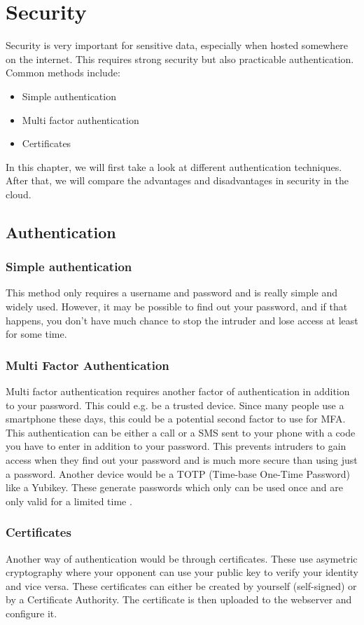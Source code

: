 \chapter{Security}
\label{chap:security}
Security is very important for sensitive data, especially when hosted somewhere on the internet.
This requires strong security but also practicable authentication. Common methods include:
\begin{itemize}
\item Simple authentication
\item Multi factor authentication
\item Certificates
\end{itemize}

In this chapter, we will first take a look at different authentication techniques. After that, we will compare the advantages and disadvantages in security in the cloud.

\section{Authentication}

\subsection{Simple authentication}
This method only requires a username and password and is really simple and widely used. However, it may be possible to find out your password, and if that happens, you don't have much chance to stop the intruder and lose access at least for some time.

\subsection{Multi Factor Authentication}
Multi factor authentication requires another factor of authentication in addition to your password. This could e.g. be a trusted device. Since many people use a smartphone these days, this could be a potential second factor to use for MFA.
This authentication can be either a call or a SMS sent to your phone with a code you have to enter in addition to your password. This prevents intruders to gain access when they find out your password and is much more secure than using just a password. 
Another device would be a TOTP (Time-base One-Time Password) like a Yubikey. These generate passwords which only can be used once and are only valid for a limited time \cite{cloud_acc}. 


\subsection{Certificates}
Another way of authentication would be through certificates. These use asymetric cryptography where your opponent can use your public key to verify your identity and vice versa. These certificates can either be created by yourself (self-signed) or by a Certificate Authority. The certificate is then uploaded to the webserver and configure it.


